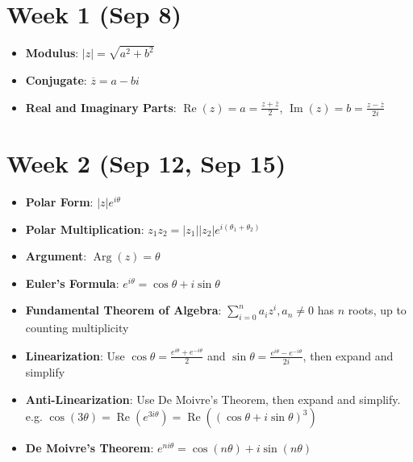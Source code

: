 \documentclass[12pt]{article}
\DeclareMathOperator{\real}{Re}
\DeclareMathOperator{\imgn}{Im}
\DeclareMathOperator{\agmt}{Arg}
\begin{document}
\section*{Week 1 (Sep 8)}
\begin{itemize}
    \item \textbf{Modulus}: $|z|=\sqrt{a^2+b^2}$
    \item \textbf{Conjugate}: $\overline{z}=a-bi$
    \item \textbf{Real and Imaginary Parts}: $\real(z)=a=\frac{z+\overline{z}}{2}$, $\imgn(z)=b=\frac{z-\overline{z}}{2i}$
\end{itemize}

\section*{Week 2 (Sep 12, Sep 15)}
\begin{itemize}
    \item \textbf{Polar Form}: $|z|e^{i\theta}$
    \item \textbf{Polar Multiplication}: $z_1z_2=|z_1||z_2|e^{i(\theta_1+\theta_2)}$
    \item \textbf{Argument}: $\agmt(z)=\theta$
    \item \textbf{Euler's Formula}: $e^{i\theta}=\cos\theta+i\sin\theta$
    \item \textbf{Fundamental Theorem of Algebra}: $\sum_{i=0}^na_iz^i,a_n\neq0$ has $n$ roots, up to counting multiplicity
    \item \textbf{Linearization}: Use $\cos\theta=\frac{e^{i\theta}+e^{-i\theta}}{2}$ and $\sin\theta=\frac{e^{i\theta}-e^{-i\theta}}{2i}$, then expand and simplify
    \item \textbf{Anti-Linearization}: Use De Moivre's Theorem, then expand and simplify. \\
    e.g. $\cos(3\theta)=\real(e^{3i\theta})=\real((\cos\theta+i\sin\theta)^3)$
    \item \textbf{De Moivre's Theorem}: $e^{ni\theta}=\cos(n\theta)+i\sin(n\theta)$
\end{itemize}
\end{document}
